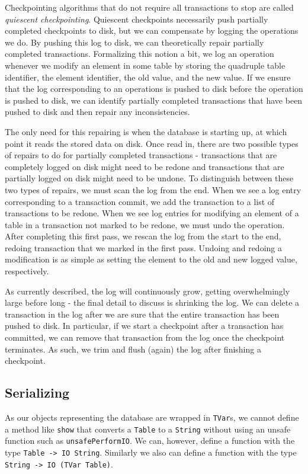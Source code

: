 \documentclass[10pt]{article}
\begin{document}
\begin{multicols}{2}
Checkpointing algorithms that do not require all transactions to stop are called \textit{quiescent checkpointing}. Quiescent checkpoints necessarily push partially completed checkpoints to disk, but we can compensate by logging the operations we do. By pushing this log to disk, we can theoretically repair partially completed transactions. Formalizing this notion a bit, we log an operation whenever we modify an element in some table by storing the quadruple table identifier, the element identifier, the old value, and the new value. If we ensure that the log corresponding to an operations is pushed to disk before the operation is pushed to disk, we can identify partially completed transactions that have been pushed to disk and then repair any inconsistencies.

The only need for this repairing is when the database is starting up, at which point it reads the stored data on disk. Once read in, there are two possible types of repairs to do for partially completed transactions - transactions that are completely logged on disk might need to be redone and transactions that are partially logged on disk might need to be undone. To distinguish between these two types of repairs, we must scan the log from the end. When we see a log entry corresponding to a transaction commit, we add the transaction to a list of transactions to be redone. When we see log entries for modifying an element of a table in a transaction not marked to be redone, we must undo the operation. After completing this first pass, we rescan the log from the start to the end, redoing transaction that we marked in the first pass. Undoing and redoing a modification is as simple as setting the element to the old and new logged value, respectively.

As currently described, the log will continuously grow, getting overwhelmingly large before long - the final detail to discuss is shrinking the log. We can delete a transaction in the log after we are sure that the entire transaction has been pushed to disk. In particular, if we start a checkpoint after a transaction has committed, we can remove that transaction from the log once the checkpoint terminates. As such, we trim and flush (again) the log after finishing a checkpoint.


\subsection{Serializing}
As our objects representing the database are wrapped in \texttt{TVar}s, we cannot define a method like \texttt{show} that converts a \texttt{Table} to a \texttt{String} without using an unsafe function such as \texttt{unsafePerformIO}. We can, however, define a function with the type \texttt{Table -> IO String}. Similarly we also can define a function with the type \texttt{String -> IO (TVar Table)}.


\end{multicols}
\end{document}
